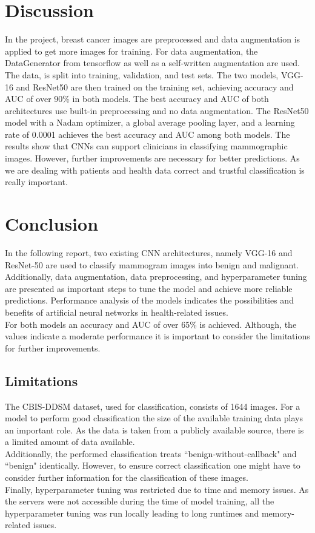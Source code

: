 \documentclass[sn-mathphys,Numbered]{sn-jnl}%
\theoremstyle{thmstyleone}%
\theoremstyle{thmstyletwo}%
\theoremstyle{thmstylethree}%
\begin{document}
\section{Discussion}\label{Discussion}
In the project, breast cancer images are preprocessed and data augmentation is applied to get more images for training. For data augmentation, the DataGenerator from tensorflow as well as a self-written augmentation are used.\\
The data, is split into training, validation, and test sets. The two models, VGG-16 and ResNet50 are then trained on the training set, achieving accuracy and AUC of over 90\% in both models. The best accuracy and AUC of both architectures use built-in preprocessing  and no data augmentation. The ResNet50 model with a Nadam optimizer, a global average pooling layer, and a learning rate of 0.0001 achieves the best accuracy and AUC among both models.
The results show that CNNs can support clinicians in classifying mammographic images. However, further improvements are necessary for better predictions. As we are dealing with patients and health data correct and trustful classification is really important.

\section{Conclusion}\label{conclusion}
In the following report, two existing CNN architectures, namely VGG-16 and ResNet-50 are used to classify mammogram images into benign and malignant.\\
Additionally, data augmentation, data preprocessing, and hyperparameter tuning are presented as important steps to tune the model and achieve more reliable predictions.
Performance analysis of the models indicates the possibilities and benefits of artificial neural networks in health-related issues. \\
For both models an accuracy and AUC of over 65\% is achieved.
Although, the values indicate a moderate performance it is important to consider the limitations for further improvements.
\subsection{Limitations}\label{limitation}
The CBIS-DDSM dataset, used for classification, consists of 1644 images. For a model to perform good classification the size of the available training data plays an important role. As the data is taken from a publicly available source, there is a limited amount of data available. \\
Additionally, the performed classification treats ``benign-without-callback"  and ``benign" identically. However, to ensure correct classification one might have to consider further information for the classification of these images.\\
Finally, hyperparameter tuning was restricted due to time and memory issues. As the servers were not accessible during the time of model training, all the hyperparameter tuning was run locally leading to long runtimes and memory-related issues.




\end{document}
